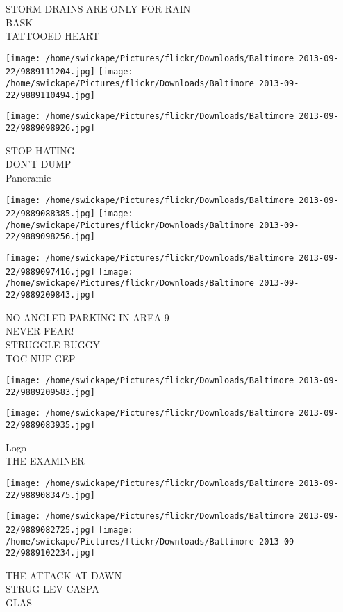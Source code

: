 \documentclass[10pt,letterpaper]{article}
\begin{document}
STORM DRAINS ARE ONLY FOR RAIN\\
BASK\\
TATTOOED HEART
\pagebreak

\texttt{[image: /home/swickape/Pictures/flickr/Downloads/Baltimore 2013-09-22/9889111204.jpg]}
\texttt{[image: /home/swickape/Pictures/flickr/Downloads/Baltimore 2013-09-22/9889110494.jpg]}

\vspace{0.25in}
\texttt{[image: /home/swickape/Pictures/flickr/Downloads/Baltimore 2013-09-22/9889098926.jpg]}

STOP HATING\\
DON'T DUMP\\
Panoramic
\pagebreak

\texttt{[image: /home/swickape/Pictures/flickr/Downloads/Baltimore 2013-09-22/9889088385.jpg]}
\texttt{[image: /home/swickape/Pictures/flickr/Downloads/Baltimore 2013-09-22/9889098256.jpg]}

\texttt{[image: /home/swickape/Pictures/flickr/Downloads/Baltimore 2013-09-22/9889097416.jpg]}
\texttt{[image: /home/swickape/Pictures/flickr/Downloads/Baltimore 2013-09-22/9889209843.jpg]}

NO ANGLED PARKING IN AREA 9\\
NEVER FEAR!\\
STRUGGLE BUGGY\\
TOC NUF GEP
\pagebreak

\texttt{[image: /home/swickape/Pictures/flickr/Downloads/Baltimore 2013-09-22/9889209583.jpg]}

\vspace{0.25in}
\texttt{[image: /home/swickape/Pictures/flickr/Downloads/Baltimore 2013-09-22/9889083935.jpg]}

Logo\\
THE EXAMINER
\pagebreak

\texttt{[image: /home/swickape/Pictures/flickr/Downloads/Baltimore 2013-09-22/9889083475.jpg]}

\vspace{0.25in}
\texttt{[image: /home/swickape/Pictures/flickr/Downloads/Baltimore 2013-09-22/9889082725.jpg]}
\texttt{[image: /home/swickape/Pictures/flickr/Downloads/Baltimore 2013-09-22/9889102234.jpg]}

THE ATTACK AT DAWN\\
STRUG LEV CASPA\\
GLAS
\pagebreak
\end{document}
